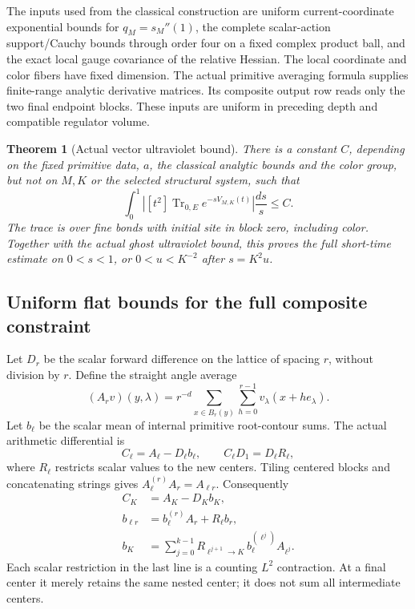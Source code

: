 \documentclass[11pt]{article}
\newtheorem{theorem}{Theorem}[section]
\theoremstyle{remark}
\begin{document}
The inputs used from the classical construction are uniform
current-coordinate exponential bounds for \(q_M=s_M''(1)\),
the complete scalar-action support/Cauchy bounds through order
four on a fixed complex product ball, and the exact local gauge
covariance of the relative Hessian. The local coordinate and
color fibers have fixed dimension. The actual primitive
averaging formula supplies finite-range analytic derivative
matrices. Its composite output row reads only the two final
endpoint blocks. These inputs are uniform in preceding depth
and compatible regulator volume.

\begin{theorem}[Actual vector ultraviolet bound]
\label{vst-theorem}
There is a constant \(C\), depending on the fixed primitive
data, \(a\), the classical analytic bounds and the color group,
but not on \(M,K\) or the selected structural system, such that
\begin{equation}
 \int_0^1\left|[t^2]\operatorname{Tr}_{0,E}
                         e^{-sV_{M,K}(t)}\right|\frac{ds}{s}
 \le C.
 \label{vst-main}
\end{equation}
The trace is over fine bonds with initial site in block zero,
including color. Together with the actual ghost ultraviolet
bound, this proves the full short-time estimate on
\(0<s<1\), or \(0<u<K^{-2}\) after \(s=K^2u\).
\end{theorem}

\subsection{Uniform flat bounds for the full composite constraint}
\label{vst-flat-section}

Let \(D_r\) be the scalar forward difference on the lattice
of spacing \(r\), without division by \(r\). Define the
straight angle average
\begin{equation}
 (A_r v)(y,\lambda)=r^{-d}
       \sum_{x\in B_r(y)}\sum_{h=0}^{r-1}
                              v_\lambda(x+h e_\lambda).
 \label{vst-straight}
\end{equation}
Let \(b_\ell\) be the scalar mean of internal primitive
root-contour sums. The actual arithmetic differential is
\begin{equation}
 C_\ell=A_\ell-D_\ell b_\ell,\qquad
 C_\ell D_1=D_\ell R_\ell,
 \label{vst-primitive}
\end{equation}
where \(R_\ell\) restricts scalar values to the new centers.
Tiling centered blocks and concatenating strings gives
\(A_\ell^{(r)}A_r=A_{\ell r}\). Consequently
\begin{equation}
 \begin{split}
 C_K&=A_K-D_Kb_K,\\
 b_{\ell r}&=b_\ell^{(r)}A_r+R_\ell b_r,\\
 b_K&=\sum_{j=0}^{k-1}
       R_{\ell^{j+1}\to K}\,b_\ell^{(\ell^j)}A_{\ell^j}.
 \end{split}
 \label{vst-recursion}
\end{equation}
Each scalar restriction in the last line is a counting
\(L^2\) contraction. At a final center it merely retains
the same nested center; it does not sum all intermediate
centers.
\end{document}
